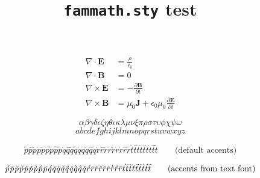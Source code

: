 \documentclass{article}
\title{\texttt{fammath.sty} test}
\date{}
\begin{document}
  \maketitle

  \begin{align*}
    \nabla\cdot\mathbf{E} &= \frac{\rho}{\epsilon_0}\\
    \nabla\cdot\mathbf{B} &= 0\\
    \nabla\times\mathbf{E} &= -\frac{\partial\mathbf{B}}{\partial{t}}\\
    \nabla\times\mathbf{B} &= \mu_0\mathbf{J} + \epsilon_0\mu_0\frac{\partial\mathbf{E}}{\partial{t}}
  \end{align*}

  \begin{equation}
    \alpha \beta \gamma \delta \epsilon \zeta \eta \theta \iota \kappa \lambda \mu \nu \xi \pi \rho \sigma \tau \upsilon \phi \chi \psi \omega
  \end{equation}
  \begin{equation}
    abcdefghijklmnopqrstuvwxyz
  \end{equation}

  \begin{equation}
  \acute{p}
  \bar{p}
  \breve{p}
  \check{p}
  \ddot{p}
  \dot{p}
  \grave{p}
  \hat{p}
  \tilde{p}
  \acute{q}
  \bar{q}
  \breve{q}
  \check{q}
  \ddot{q}
  \dot{q}
  \grave{q}
  \hat{q}
  \tilde{q}
  \acute{r}
  \bar{r}
  \breve{r}
  \check{r}
  \ddot{r}
  \dot{r}
  \grave{r}
  \hat{r}
  \tilde{r}
  \acute{t}
  \bar{t}
  \breve{t}
  \check{t}
  \ddot{t}
  \dot{t}
  \grave{t}
  \hat{t}
  \tilde{t}
  \qquad{\text{(default accents)}}
  \end{equation}

  \begin{equation}
  \sacute{p}
  \sbar{p}
  \sbreve{p}
  \scheck{p}
  \sddot{p}
  \sdot{p}
  \sgrave{p}
  \shat{p}
  \stilde{p}
  \sacute{q}
  \sbar{q}
  \sbreve{q}
  \scheck{q}
  \sddot{q}
  \sdot{q}
  \sgrave{q}
  \shat{q}
  \stilde{q}
  \sacute{r}
  \sbar{r}
  \sbreve{r}
  \scheck{r}
  \sddot{r}
  \sdot{r}
  \sgrave{r}
  \shat{r}
  \stilde{r}
  \sacute{t}
  \sbar{t}
  \sbreve{t}
  \scheck{t}
  \sddot{t}
  \sdot{t}
  \sgrave{t}
  \shat{t}
  \stilde{t}
  \qquad{\text{(accents from text font)}}
  \end{equation}
\end{document}
